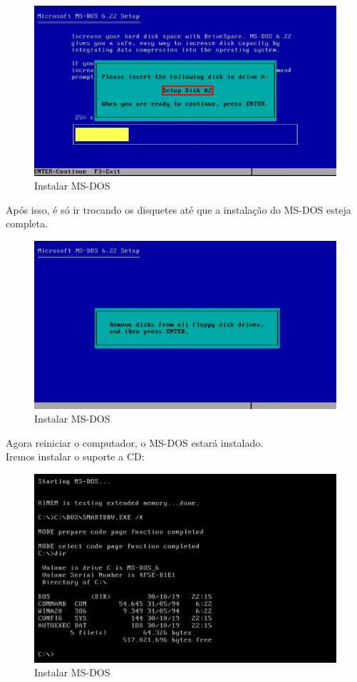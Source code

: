 \documentclass{report}
\begin{document}
\begin{figure}
\centering
\includegraphics[width=\textwidth]{Screenshot_19.png}
\caption{Instalar MS-DOS}
\label{fig:19}
\end{figure}

\newpage
Após isso, é só ir trocando os disquetes até que a instalação do MS-DOS esteja completa.

\begin{figure}
\centering
\includegraphics[width=\textwidth]{Screenshot_20.png}
\caption{Instalar MS-DOS}
\label{fig:20}
\end{figure}

\newpage
Agora reiniciar o computador, o MS-DOS estará instalado.\\
Iremos instalar o suporte a CD:

\begin{figure}
\centering
\includegraphics[width=\textwidth]{Screenshot_21.png}
\caption{Instalar MS-DOS}
\label{fig:21}
\end{figure}
\end{document}
